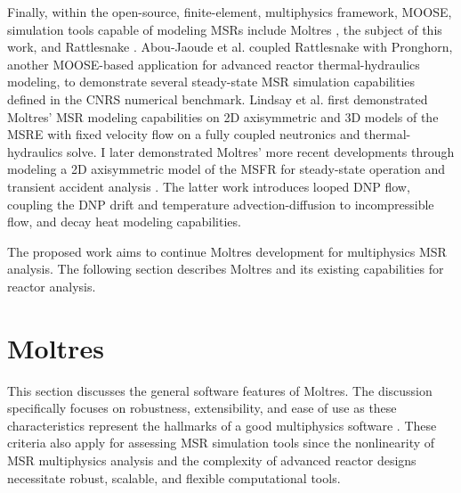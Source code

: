 Finally, within the open-source, finite-element, multiphysics framework, MOOSE,
simulation tools capable of modeling
\glspl{MSR} include Moltres \cite{lindsay_moltres_2017}, the subject of
this work, and Rattlesnake \cite{wang_rattlesnake_2021}. Abou-Jaoude et al.
\cite{abou-jaoude_coupled_2020} coupled Rattlesnake with Pronghorn, another
MOOSE-based application for advanced reactor thermal-hydraulics modeling, to
demonstrate several steady-state \gls{MSR} simulation capabilities defined in
the \gls{CNRS} numerical benchmark. Lindsay et al.
\cite{lindsay_introduction_2018} first demonstrated Moltres' \gls{MSR} modeling
capabilities on 2D axisymmetric and 3D models of the \gls{MSRE} with fixed
velocity flow on a fully coupled neutronics and thermal-hydraulics solve. I
later demonstrated Moltres' more recent developments through modeling a 2D
axisymmetric model of the \gls{MSFR} for steady-state operation and transient
accident analysis \cite{park_advancement_2020}. The latter work introduces
looped \gls{DNP} flow, coupling the \gls{DNP} drift and temperature 
advection-diffusion to incompressible flow, and decay heat modeling
capabilities.

The proposed work aims to continue Moltres development for multiphysics
\gls{MSR} analysis. The following section describes Moltres and its existing
capabilities for reactor analysis.

\section{Moltres}

This section discusses the general software features of Moltres. The
discussion specifically focuses on robustness, extensibility, and ease of use
as these characteristics represent the hallmarks of a good multiphysics
software \cite{keyes_multiphysics_2013}. These criteria also apply for
assessing \gls{MSR} simulation tools since the nonlinearity of \gls{MSR}
multiphysics analysis and the complexity of advanced reactor designs
necessitate robust, scalable, and flexible computational tools.

